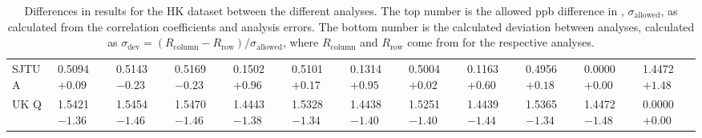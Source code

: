 \begin{landscape}
\begin{table}
\begin{tabularx}{1\linewidth}{@{\extracolsep{\fill}}lXXXXXXXXXXX}
	SJTU A & 0.5094 $+0.09$ & 0.5143 $-0.23$ & 0.5169 $-0.23$ & 0.1502 $+0.96$ & 0.5101 $+0.17$ & 0.1314 $+0.95$ & 0.5004 $+0.02$ & 0.1163 $+0.60$ & 0.4956 $+0.18$ & 0.0000 $+0.00$ & 1.4472 $+1.48$  \\
	UK Q   & 1.5421 $-1.36$ & 1.5454 $-1.46$ & 1.5470 $-1.46$ & 1.4443 $-1.38$ & 1.5328 $-1.34$ & 1.4438 $-1.40$ & 1.5251 $-1.40$ & 1.4439 $-1.44$ & 1.5365 $-1.34$ & 1.4472 $-1.48$ & 0.0000 $+0.00$  \\
  \bottomrule
\end{tabularx}
\caption[]{Differences in results for the HK dataset between the different analyses. The top number is the allowed ppb difference in \R, $\sigma_{\text{allowed}}$, as calculated from the correlation coefficients and analysis errors. The bottom number is the calculated deviation between analyses, calculated as $\sigma_{\text{dev}} = (R_{\text{column}}-R_{\text{row}})/\sigma_{\text{allowed}}$, where $R_{\text{column}}$ and $R_{\text{row}}$ come from  for the respective analyses.}
\label{tab:HK_diff}
\end{table}
\end{landscape}



